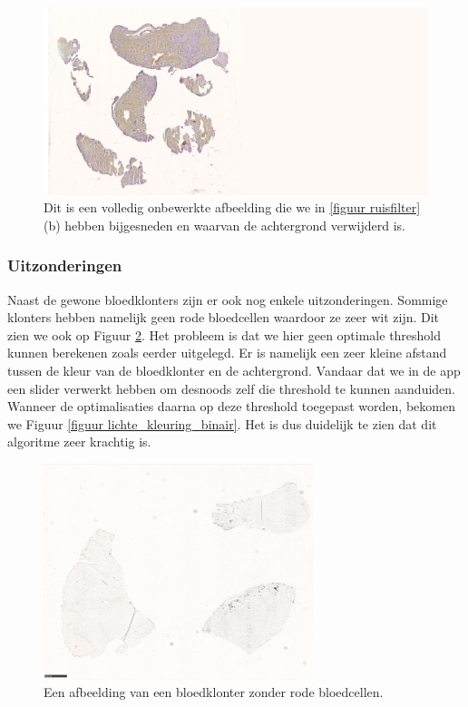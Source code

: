 \documentclass[a4paper,kulak]{kulakarticle}
\begin{document}
\begin{figure}[H]
	\centering
	\includegraphics[width=15.25cm]{Volledig_onbewerkt}
	
	\caption{Dit is een volledig onbewerkte afbeelding die we in \ref{figuur ruisfilter} (b) hebben bijgesneden en waarvan de achtergrond verwijderd is.}
	\label{figuur volledig_onbewerkt}
\end{figure}

\subsubsection{Uitzonderingen}
Naast de gewone bloedklonters zijn er ook nog enkele uitzonderingen. Sommige klonters hebben namelijk geen rode bloedcellen waardoor ze zeer wit zijn. Dit zien we ook op Figuur \ref{figuur lichte_kleuring}. Het probleem is dat we hier geen optimale threshold kunnen berekenen zoals eerder uitgelegd. Er is namelijk een zeer kleine afstand tussen de kleur van de bloedklonter en de achtergrond. Vandaar dat we in de app een slider verwerkt hebben om desnoods zelf die threshold te kunnen aanduiden. Wanneer de optimalisaties daarna op deze threshold toegepast worden, bekomen we Figuur \ref{figuur lichte_kleuring_binair}. Het is dus duidelijk te zien dat dit algoritme zeer krachtig is.

\begin{figure}[H]
	\centering
	\includegraphics[width=0.7\textwidth]{lichte_kleuring}
	
	\caption{Een afbeelding van een bloedklonter zonder rode bloedcellen.}
	\label{figuur lichte_kleuring}
\end{figure}
\end{document}
